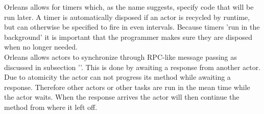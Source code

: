 Orleans allows for timers which, as the name suggests, specify code that will be run later. A timer is automatically disposed if an actor is recycled by runtime, but can otherwise be specified to fire in even intervals. Because timers 'run in the background' it is important that the programmer makes sure they are disposed when no longer needed.\\
Orleans allows actors to synchronize through RPC-like message passing as discussed in subsection ''. This is done by awaiting a response from another actor. Due to atomicity the actor can not progress its method while awaiting a response. Therefore other actors or other tasks are run in the mean time while the actor waits. When the response arrives the actor will then continue the method from where it left off.